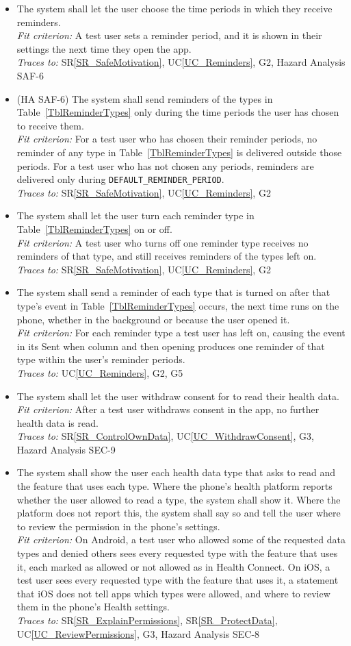 \documentclass[12pt]{article}
\newcommand{\srref}[1]{SR\ref{#1}}
\newcommand{\ucref}[1]{UC\ref{#1}}
\newcounter{reqnum} %
\newcommand{\freq}[4]{%
  \item[FR\refstepcounter{reqnum}\thereqnum \label{#1}:] #2\\
  \textit{Fit criterion:} #3\\
  \textit{Traces to:} #4}
\begin{document}
\noindent \begin{itemize}
\freq{FR_RemindPeriods}
  {The system shall let the user choose the time periods in which they receive
  reminders.}
  {A test user sets a reminder period, and it is shown in their settings the
  next time they open the app.}
  {\srref{SR_SafeMotivation}, \ucref{UC_Reminders}, G2, Hazard Analysis SAF-6}
\freq{FR_RemindInPeriods}
  {(HA SAF-6) The system shall send reminders of the types in
  Table~\ref{TblReminderTypes} only during the time periods the user has chosen
  to receive them.}
  {For a test user who has chosen their reminder periods, no reminder of any type
  in Table~\ref{TblReminderTypes} is delivered outside those periods. For a test
  user who has not chosen any periods, reminders are delivered only during
  \texttt{DEFAULT\_REMINDER\_PERIOD}.}
  {\srref{SR_SafeMotivation}, \ucref{UC_Reminders}, G2}
\freq{FR_RemindTypes}
  {The system shall let the user turn each reminder type in
  Table~\ref{TblReminderTypes} on or off.}
  {A test user who turns off one reminder type receives no reminders of that
  type, and still receives reminders of the types left on.}
  {\srref{SR_SafeMotivation}, \ucref{UC_Reminders}, G2}
\freq{FR_RemindSend}
  {The system shall send a reminder of each type that is turned on after that
  type's event in Table~\ref{TblReminderTypes} occurs, the next time \progname{}
  runs on the phone, whether in the background or because the user opened it.}
  {For each reminder type a test user has left on, causing the event in its
  Sent when column and then opening \progname{} produces one reminder of that
  type within the user's reminder periods.}
  {\ucref{UC_Reminders}, G2, G5}
\freq{FR_SetWithdrawConsent}
  {The system shall let the user withdraw consent for \progname{} to read their
  health data.}
  {After a test user withdraws consent in the app, no further health data is
  read.}
  {\srref{SR_ControlOwnData}, \ucref{UC_WithdrawConsent}, G3, Hazard Analysis
  SEC-9}
\freq{FR_SetPermissionList}
  {The system shall show the user each health data type that \progname{} asks
  to read and the feature that uses each type. Where the phone's health
  platform reports whether the user allowed \progname{} to read a type, the
  system shall show it. Where the platform does not report this, the system
  shall say so and tell the user where to review the permission in the
  phone's settings.}
  {On Android, a test user who allowed some of the requested data types and
  denied others sees every requested type with the feature that uses it, each
  marked as allowed or not allowed as in Health Connect. On iOS, a test user
  sees every requested type with the feature that uses it, a statement that
  iOS does not tell apps which types were allowed, and where to review them in
  the phone's Health settings.}
  {\srref{SR_ExplainPermissions}, \srref{SR_ProtectData},
  \ucref{UC_ReviewPermissions}, G3, Hazard Analysis SEC-8}
\end{itemize}
\end{document}
